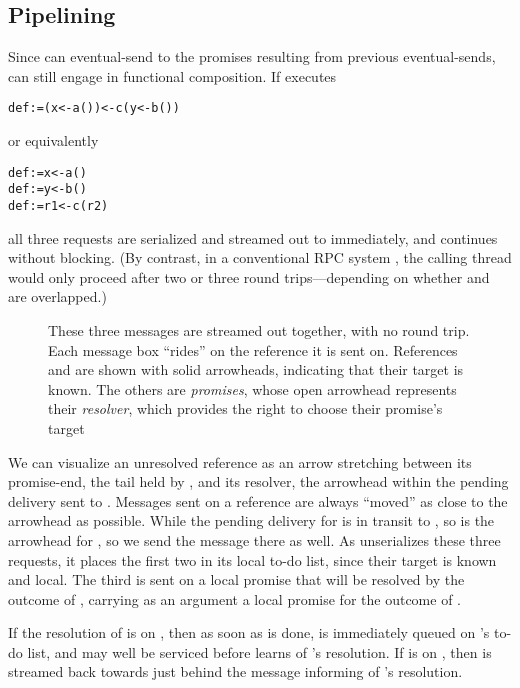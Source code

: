 \documentclass{llncs}
\begin{document}
\subsection{Pipelining}

Since  can eventual-send to the promises resulting from
previous eventual-sends,  can still engage in functional
composition. If  executes
%
\begin{alltt}
    def  := (x <- a()) <- c(y <- b())
\end{alltt}
%
or equivalently
%
\begin{alltt}
    def  := x <- a()
    def  := y <- b()
    def  := r1 <- c(r2)
\end{alltt}
%
all three requests are serialized and streamed out to 
immediately, and  continues without blocking. (By contrast, in
a conventional RPC system
\cite{Nelson81,java:rmi,corba:latency,xml-rpc:latency}, the calling
thread would only proceed after two or three round trips---depending
on whether  and  are overlapped.)

\begin{figure}
\centerline{}
\caption{These three messages are streamed out together, with no round
  trip. Each message box ``rides'' on the reference it is sent
  on. References  and  are shown with solid arrowheads,
  indicating that their target is known. The others are
  \emph{promises}, whose open arrowhead represents their
  \emph{resolver}, which provides the right to choose their promise's
  target}
\label{fig:pipeline}
\end{figure}

We can visualize an unresolved reference as an arrow stretching
between its promise-end, the tail held by , and its resolver,
the arrowhead within the pending delivery sent to . Messages
sent on a reference are always ``moved'' as close to the arrowhead as
possible. While the pending delivery for  is in transit to
, so is the arrowhead for , so we send the 
message there as well. As  unserializes these three requests,
it places the first two in its local to-do list, since their target is
known and local. The third is sent on a local promise that will be
resolved by the outcome of , carrying as an argument a local
promise for the outcome of .

If the resolution of  is on , then as soon as
 is done,  is immediately queued on 's
to-do list, and may well be serviced before  learns of
's resolution. If  is on , then  is
streamed back towards  just behind the message informing
 of 's resolution.
\end{document}
